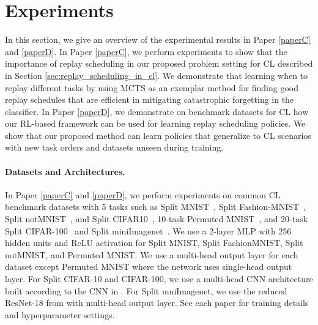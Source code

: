 \section{Experiments}

In this section, we give an overview of the experimental results in Paper \ref{paperC} and \ref{paperD}. In Paper \ref{paperC}, we perform experiments to show that the importance of replay scheduling in our proposed problem setting for CL described in Section \ref{sec:replay_scheduling_in_cl}. We demonstrate that learning when to replay different tasks by using MCTS as an exemplar method for finding good replay schedules that are efficient in mitigating catastrophic forgetting in the classifier. In Paper \ref{paperD}, we demonstrate on benchmark datasets for CL how our RL-based framework can be used for learning replay scheduling policies. We show that our proposed method can learn policies that generalize to CL scenarios with new task orders and datasets unseen during training.  

\vspace{-3mm}
\paragraph{Datasets and Architectures.} In Paper \ref{paperC} and \ref{paperD}, we perform experiments on common CL benchmark datasets with 5 tasks such as Split MNIST~\cite{zenke2017continual}, Split Fashion-MNIST~\cite{xiao2017fashion}, Split notMNIST~\cite{bulatov2011notMNIST}, and Split CIFAR10~\cite{krizhevsky2009learning}, 10-task Permuted MNIST~\cite{goodfellow2013empirical}, and 20-task Split CIFAR-100~\cite{krizhevsky2009learning, lopez2017gradient, rebuffi2017icarl} and Split miniImagenet~\cite{vinyals2016matching}. We use a 2-layer MLP with 256 hidden units and ReLU activation for Split MNIST, Split FashionMNIST, Split notMNIST, and Permuted MNIST. We use a multi-head output layer for each dataset except Permuted MNIST where the network uses single-head output layer. For Split CIFAR-10 and CIFAR-100, we use a multi-head CNN architecture built according to the CNN in \cite{adel2019continual, schwarz2018progress, vinyals2016matching}. For Split mniImagenet, we use the reduced ResNet-18 from \cite{lopez2017gradient} with multi-head output layer. See each paper for training details and hyperparameter settings. 



\vspace{-3mm}
